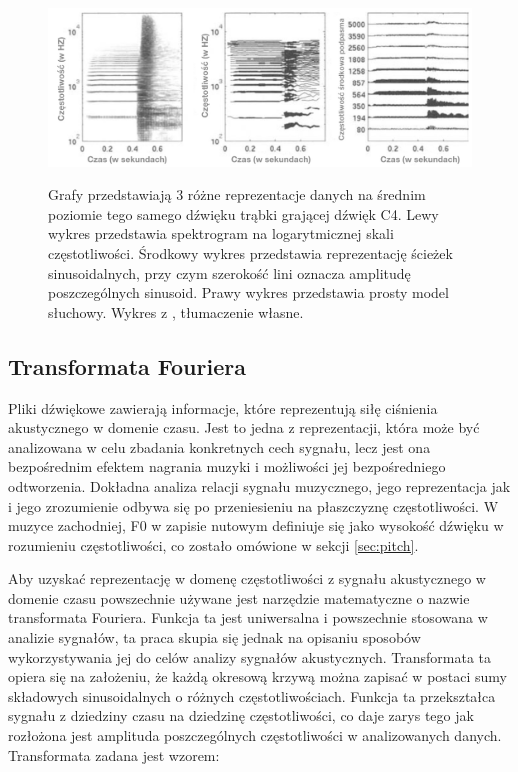 \documentclass[12pt,a4paper,twoside]{mwart}
\begin{document}
\begin{figure}[t]
  \begin{center}
  \includegraphics[scale=0.3]{images/mid_level_representation.jpg}\\
  \caption{Grafy przedstawiają 3 różne reprezentacje danych na średnim poziomie tego samego dźwięku trąbki grającej dźwięk C4. Lewy wykres przedstawia spektrogram na logarytmicznej skali częstotliwości. Środkowy wykres przedstawia reprezentację ścieżek sinusoidalnych, przy czym szerokość lini oznacza amplitudę poszczególnych sinusoid. Prawy wykres przedstawia prosty model słuchowy. Wykres z 
  \cite[14]{Transcription:Anssi:SignalProcessingMethods},
  tłumaczenie własne.
  }
  \label{fig:mid_level_representation}
  \end{center}
\end{figure}

\subsection{Transformata Fouriera}\label{sec:TF}
Pliki dźwiękowe zawierają informacje, które reprezentują siłę ciśnienia akustycznego w domenie czasu. Jest to jedna z reprezentacji, która może być analizowana w celu zbadania konkretnych cech sygnału, lecz jest ona bezpośrednim efektem nagrania muzyki i możliwości jej bezpośredniego odtworzenia. Dokładna analiza relacji sygnału muzycznego, jego reprezentacja jak i jego zrozumienie odbywa się po przeniesieniu na płaszczyznę częstotliwości. W muzyce zachodniej, F0 w zapisie nutowym definiuje się jako wysokość dźwięku w rozumieniu częstotliwości, co zostało omówione w sekcji \ref{sec:pitch}.

Aby uzyskać reprezentację w domenę częstotliwości z sygnału akustycznego w domenie czasu powszechnie używane jest narzędzie matematyczne o nazwie transformata Fouriera. Funkcja ta jest uniwersalna i powszechnie stosowana w analizie sygnałów, ta praca skupia się jednak na opisaniu sposobów wykorzystywania jej do celów analizy sygnałów akustycznych. Transformata ta opiera się na założeniu, że każdą okresową krzywą można zapisać w postaci sumy składowych sinusoidalnych o różnych częstotliwościach. Funkcja ta przekształca sygnału z dziedziny czasu na dziedzinę częstotliwości, co daje zarys tego jak rozłożona jest amplituda poszczególnych częstotliwości w analizowanych danych. Transformata zadana jest wzorem:
\end{document}
